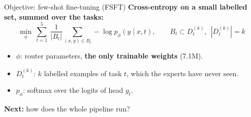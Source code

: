 \documentclass[aspectratio=169,10pt]{beamer}
\newcommand{\nextq}[1]{\vfill\raggedright{\small\color{hustmain}\textbf{Next:} #1}}
\begin{document}
\begin{frame}{Objective: few-shot fine-tuning (FSFT)}
  \textbf{Cross-entropy on a small labelled set, summed over the tasks:}
  \[
    \min_{\phi}\ \sum_{t=1}^{5}\ \frac{1}{|B_t|}\sum_{(x,y)\in B_t}-\log p_{\phi}(y\mid x,t),
    \qquad B_t\subset D_t^{(k)},\ \ |D_t^{(k)}|=k
  \]
  \begin{itemize}
    \item $\phi$: router parameters, \textbf{the only trainable weights} (7.1M).
    \item $D_t^{(k)}$: $k$ labelled examples of task $t$, which the experts have never seen.
    \item $p_{\phi}$: softmax over the logits of head $g_t$.
  \end{itemize}
  \vfill
  \centering
  \nextq{how does the whole pipeline run?}
\end{frame}
\end{document}
